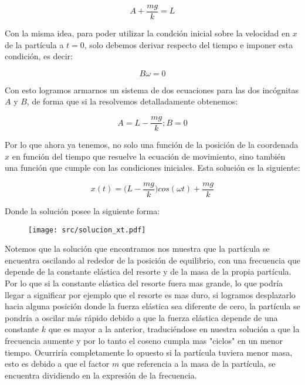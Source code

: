 \documentclass{article}
\begin{document}
\begin{multicols}{2}
\begin{equation}
    A + \frac{mg}{k} = L
\end{equation}

Con la misma idea, para poder utilizar la condción inicial sobre la velocidad en $x$ de la partícula a $t= 0$, solo debemos derivar respecto del tiempo e imponer esta condición, es decir:

\begin{equation}
    B\omega = 0
\end{equation}

Con esto logramos armarnos un sistema de dos ecuaciones para las dos incógnitas $A$ y $B$, de forma que si la resolvemos detalladamente obtenemos:

\begin{equation}
    A = L - \frac{mg}{k} ; B = 0
\end{equation}

Por lo que ahora ya tenemos, no solo una función de la posición de la coordenada $x$ en función del tiempo que resuelve la ecuación de movimiento, sino también una función que cumple con las condiciones iniciales. Esta solución es la siguiente:

\begin{equation}
    x(t) = \bigg( L - \frac{mg}{k} \bigg)cos(\omega t) + \frac{mg}{k}
\end{equation}

Donde la solución posee la siguiente forma:

\begin{figure}[H]
    \centering
    \texttt{[image: src/solucion\_xt.pdf]}
\end{figure}

Notemos que la solución que encontramos nos muestra que la partícula se encuentra oscilando al rededor de la posición de equilibrio, con una frecuencia que depende de la constante elástica del resorte y de la masa de la propia partícula. Por lo que si la constante elástica del resorte fuera mas grande, lo que podría llegar a significar por ejemplo que el resorte es mas duro, si logramos desplazarlo hacia alguna posición donde la fuerza elástica sea diferente de cero, la partícula se pondría a oscilar más rápido debido a que la fuerza elástica depende de una constante $k$ que es mayor a la anterior, traduciéndose en nuestra solución a que la frecuencia aumente y por lo tanto el coseno cumpla mas "ciclos" en un menor tiempo. Ocurriría completamente lo opuesto si la partícula tuviera menor masa, esto es debido a que el factor $m$ que referencia a la masa de la partícula, se encuentra dividiendo en la expresión de la frecuencia.


\end{multicols}
\end{document}
